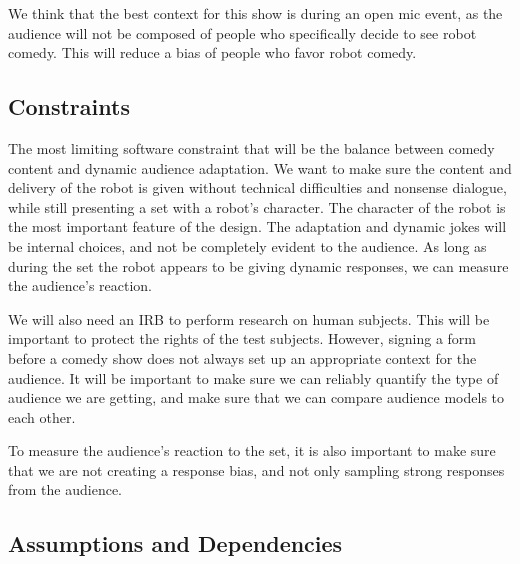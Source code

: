 \documentclass[onecolumn, draftclsnofoot,10pt, compsoc]{IEEEtran}
\begin{document}
	We think that the best context for this show is during an open mic event, as the audience will not be composed of people who specifically decide to see robot comedy. This will reduce a bias of people who favor robot comedy.



\subsection{Constraints}


The most limiting software constraint that will be the balance between comedy content and dynamic audience adaptation. We want to make sure the content and delivery of the robot is given without technical difficulties and nonsense dialogue, while still presenting a set with a robot’s character. The character of the robot is the most important feature of the design. The adaptation and dynamic jokes will be internal choices, and not be completely evident to the audience. As long as during the set the robot appears to be giving dynamic responses, we can measure the audience’s reaction.

We will also need an IRB to perform research on human subjects. This will be important to protect the rights of the test subjects. However, signing a form before a comedy show does not always set up an appropriate context for the audience. It will be important to make sure we can reliably quantify the type of audience we are getting, and make sure that we can compare audience models to each other.

To measure the audience’s reaction to the set, it is also important to make sure that we are not creating a response bias, and not only sampling strong responses from the audience.


\subsection{Assumptions and Dependencies}
\end{document}
